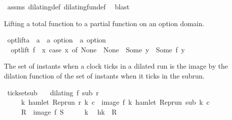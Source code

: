 \begin{isabellebody}
%
\isadelimproof
%
\endisadelimproof
%
\isatagproof
{}\isamarkupfalse%
\ assms\ dilating{\isacharunderscore}def\ dilating{\isacharunderscore}fun{\isacharunderscore}def\ \isamarkupfalse%
\ blast%
\endisatagproof
{\isafoldproof}%
%
\isadelimproof
%
\endisadelimproof
%
\begin{isamarkuptext}%
Lifting a total function to a partial function on an option domain.%
\end{isamarkuptext}\isamarkuptrue%
\isamarkupfalse%
\ opt{\isacharunderscore}lift{\isacharcolon}{\isacharcolon}{\isacartoucheopen}{\isacharparenleft}{\isacharprime}a\ {\isasymRightarrow}\ {\isacharprime}a{\isacharparenright}\ {\isasymRightarrow}\ {\isacharparenleft}{\isacharprime}a\ option\ {\isasymRightarrow}\ {\isacharprime}a\ option{\isacharparenright}{\isacartoucheclose}\isanewline
{}\isanewline
\ \ {\isacartoucheopen}opt{\isacharunderscore}lift\ f\ {\isasymequiv}\ {\isasymlambda}x{\isachardot}\ case\ x\ of\ None\ {\isasymRightarrow}\ None\ {\isacharbar}\ Some\ y\ {\isasymRightarrow}\ Some\ {\isacharparenleft}f\ y{\isacharparenright}{\isacartoucheclose}%
\begin{isamarkuptext}%
The set of instants when a clock ticks in a dilated run is the image by the dilation function
  of the set of instants when it ticks in the subrun.%
\end{isamarkuptext}\isamarkuptrue%
\isamarkupfalse%
\ tick{\isacharunderscore}set{\isacharunderscore}sub{\isacharcolon}\isanewline
\ \ \ {\isacartoucheopen}dilating\ f\ sub\ r{\isacartoucheclose}\isanewline
\ \ \ \ \ {\isacartoucheopen}{\isacharbraceleft}k{\isachardot}\ hamlet\ {\isacharparenleft}{\isacharparenleft}Rep{\isacharunderscore}run\ r{\isacharparenright}\ k\ c{\isacharparenright}{\isacharbraceright}\ {\isacharequal}\ image\ f\ {\isacharbraceleft}k{\isachardot}\ hamlet\ {\isacharparenleft}{\isacharparenleft}Rep{\isacharunderscore}run\ sub{\isacharparenright}\ k\ c{\isacharparenright}{\isacharbraceright}{\isacartoucheclose}\isanewline
\ \ \ \ {\isacharparenleft}\ {\isacartoucheopen}{\isacharquery}R\ {\isacharequal}\ image\ f\ {\isacharquery}S{\isacartoucheclose}{\isacharparenright}\isanewline
%
\isadelimproof
%
\endisadelimproof
%
\isatagproof
{}\isamarkupfalse%
\isanewline
\ \ \isacommand{{\isacharbraceleft}}\isamarkupfalse%
\ \isamarkupfalse%
\ k\ \isamarkupfalse%
\ h{\isacharcolon}{\isacartoucheopen}k\ {\isasymin}\ {\isacharquery}R{\isacartoucheclose}\isanewline

\end{isabellebody}
